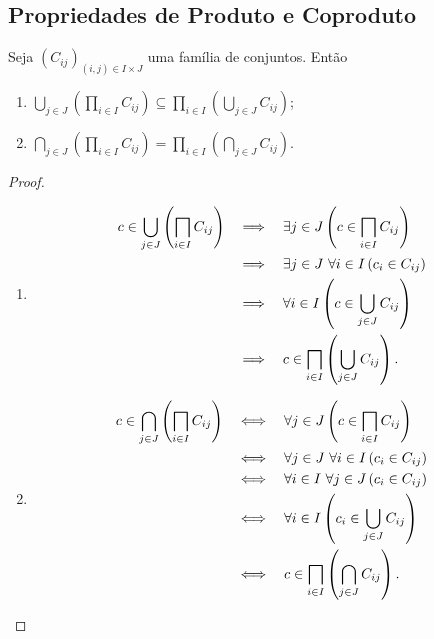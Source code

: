\cleardoublepage
\subsection{Propriedades de Produto e Coproduto}

\begin{prop}
	Seja $(C_{ij})_{(i,j) \in I \times J}$ uma família de conjuntos. Então
	\begin{enumerate}
	\item $\displaystyle \bigcup_{j \in J} \left(\prod_{i \in I} C_{ij}\right) \subseteq \prod_{i \in I} \left(\bigcup_{j \in J} C_{ij}\right)$;
	\item $\displaystyle \bigcap_{j \in J} \left(\prod_{i \in I} C_{ij}\right) = \prod_{i \in I} \left(\bigcap_{j \in J} C_{ij}\right)$.
	\end{enumerate}
\end{prop}
\begin{proof}
	\begin{enumerate}	
	\item \begin{align*}
	\displaystyle c \in  \bigcup_{j \in J} \left(\prod_{i \in I} C_{ij}\right)
		& \entao \exists j \in J \left(c \in \prod_{i \in I} C_{ij} \right) \\
		& \entao \exists j \in J \ \forall i \in I \left(c_i \in C_{ij} \right) \\
		& \entao \forall i \in I \left(c \in \bigcup_{j \in J} C_{ij} \right) \\
		& \entao  c \in \prod_{i \in I} \left(\bigcup_{j \in J} C_{ij}\right).
	\end{align*}
	
	\item 	
	\begin{align*}
	c \in \displaystyle \bigcap_{j \in J} \left(\prod_{i \in I} C_{ij}\right)
		& \sse \forall j \in J \left(c \in \prod_{i \in I} C_{ij} \right) \\
		& \sse \forall j \in J \ \forall i \in I \left(c_i \in C_{ij} \right) \\
		& \sse \forall i \in I \ \forall j \in J \left(c_i \in C_{ij} \right) \\
		& \sse \forall i \in I \left(c_i \in \bigcup_{j \in J} C_{ij} \right) \\
		& \sse  c \in \prod_{i \in I} \left(\bigcap_{j \in J} C_{ij}\right).
	\end{align*}
	\end{enumerate}
\end{proof}

